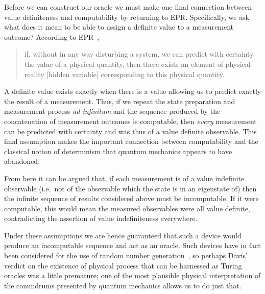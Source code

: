 \documentclass[10pt]{article}
\begin{document}
Before we can construct our oracle we must make one final connection between value definiteness and computability by returning to EPR.
Specifically, we ask what does it mean to be able to assign a definite value to a measurement outcome?
According to EPR~\cite{epr},
\begin{quote}
	if, without in any way disturbing a system, we can predict with certainty the value of a physical quantity, then there exists an element of physical reality [hidden variable] corresponding to this physical quantity.
\end{quote}
A definite value exists exactly when there is a value allowing us to predict exactly the result of a measurement.
Thus, if we repeat the state preparation and measurement process \textit{ad infinitum} and the sequence produced by the concatenation of measurement outcomes is computable, then \emph{every} measurement can be predicted with certainty and was thus of a value definite observable.
This final assumption makes the important connection between computability and the classical notion of determinism that quantum mechanics appears to have abandoned.

From here it can be argued that, if each measurement is of a value indefinite observable (i.e.\ not of the observable which the state is in an eigenstate of) then the infinite sequence of results considered above must be incomputable.
If it were computable, this would mean the measured observables were all value definite, contradicting the assertion of value indefiniteness everywhere.

Under these assumptions we are hence guaranteed that such a device would produce an incomputable sequence and act as an oracle.
Such devices have in fact been considered for the use of random number generation~\cite{Abbott:2010uq}, so perhaps Davis' verdict on the existence of physical process that can be harnessed as Turing oracles was a little premature; one of the most plausible physical interpretation of the conundrums presented by quantum mechanics allows us to do just that.
\end{document}
